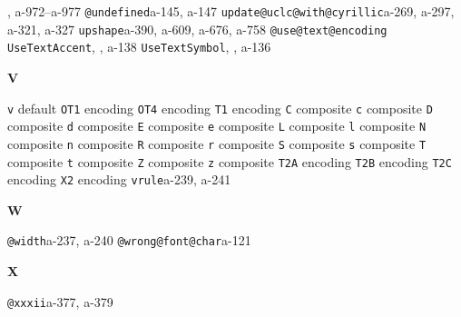 \documentclass[twoside]{ltxdoc}
\makeatletter
\renewenvironment{theindex}{%
   \@restonecoltrue
   \if@twocolumn\@restonecolfalse\fi
   \columnseprule \z@
   \columnsep 35\p@
   \twocolumn[\index@prologue]%
   \IndexParms
   \let\item\@idxitem
   \ignorespaces
}{\if@restonecol\onecolumn\else\clearpage\fi}
\makeatother
\begin{document}
\begin{theindex}
                , a-972--a-977
  \item \texttt  {@undefined}\pfill a-145, a-147
  \item \texttt  {update@uclc@with@cyrillic}\pfill a-269, 
                a-297, a-321, a-327
  \item \texttt  {upshape}\pfill a-390, a-609, a-676, 
                a-758
  \item \texttt  {@use@text@encoding}\pfill {}
  \item \texttt  {UseTextAccent}\pfill {}, 
                , a-138
  \item \texttt  {UseTextSymbol}\pfill {}, 
                , a-136

  \indexspace
{\bfseries\hfil V\hfil}\nopagebreak

  \item \texttt  {v}\efill 
    \subitem default\pfill {}
    \subitem \texttt  {OT1} encoding\pfill {}
    \subitem \texttt  {OT4} encoding\pfill {}
    \subitem \texttt  {T1} encoding\pfill {}
      \subsubitem \texttt  {C} composite\pfill {}
      \subsubitem \texttt  {c} composite\pfill {}
      \subsubitem \texttt  {D} composite\pfill {}
      \subsubitem \texttt  {d} composite\pfill {}
      \subsubitem \texttt  {E} composite\pfill {}
      \subsubitem \texttt  {e} composite\pfill {}
      \subsubitem \texttt  {L} composite\pfill {}
      \subsubitem \texttt  {l} composite\pfill {}
      \subsubitem \texttt  {N} composite\pfill {}
      \subsubitem \texttt  {n} composite\pfill {}
      \subsubitem \texttt  {R} composite\pfill {}
      \subsubitem \texttt  {r} composite\pfill {}
      \subsubitem \texttt  {S} composite\pfill {}
      \subsubitem \texttt  {s} composite\pfill {}
      \subsubitem \texttt  {T} composite\pfill {}
      \subsubitem \texttt  {t} composite\pfill {}
      \subsubitem \texttt  {Z} composite\pfill {}
      \subsubitem \texttt  {z} composite\pfill {}
    \subitem \texttt  {T2A} encoding\pfill {}
    \subitem \texttt  {T2B} encoding\pfill {}
    \subitem \texttt  {T2C} encoding\pfill {}
    \subitem \texttt  {X2} encoding\pfill {}
  \item \texttt  {vrule}\pfill a-239, a-241

  \indexspace
{\bfseries\hfil W\hfil}\nopagebreak

  \item \texttt  {@width}\pfill a-237, a-240
  \item \texttt  {@wrong@font@char}\pfill a-121

  \indexspace
{\bfseries\hfil X\hfil}\nopagebreak

  \item \texttt  {@xxxii}\pfill a-377, a-379

 \end{theindex}
\end{document}
